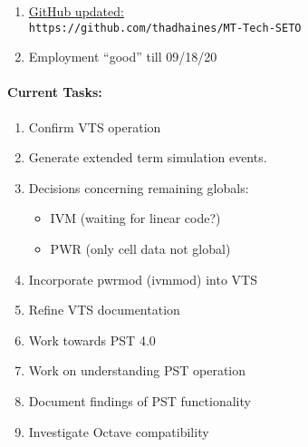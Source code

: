 \documentclass[12pt]{article}
\begin{document}
\begin{multicols}{2}
\begin{enumerate}
		\item \href{https://github.com/thadhaines/MT-Tech-SETO}{GitHub updated:}\\
	{\footnotesize \verb|https://github.com/thadhaines/MT-Tech-SETO| }\\
	\item Employment ``good'' till 09/18/20
	\end{enumerate}

\paragraph{Current Tasks:}
	\begin{enumerate}
		\itemsep 0em 
	\item Confirm VTS operation
	\item Generate extended term simulation events.
		\item Decisions concerning remaining globals:
		\begin{minipage}{\linewidth}
						\begin{itemize}
				\itemsep0em 
						\footnotesize
							\item IVM (waiting for linear code?)
							\item PWR (only cell data not global)
						\end{itemize}
				\end{minipage}
		\item Incorporate pwrmod (ivmmod) into VTS	
		\item Refine VTS documentation	
		\item Work towards PST 4.0	
		\item Work on understanding PST operation
		\item Document findings of PST functionality
		\item Investigate Octave compatibility
\end{enumerate}


\end{multicols}
\end{document}
